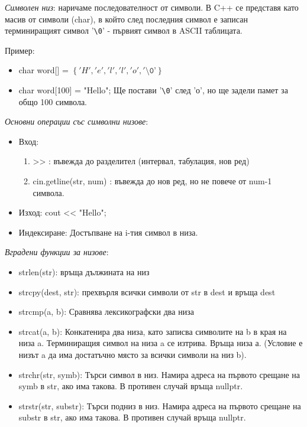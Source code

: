 \documentclass{article}
\renewcommand{\\}{\newline}
\begin{document}
\textit{Символен низ}: наричаме последователност от символи. В C++ се представя като масив от символи (char), в който след последния символ е записан терминиращият символ '\texttt{\textbackslash0}' - първият символ в ASCII таблицата.

Пример: 
\begin{itemize}
  \item char word[] = \(\left\{'H', 'e', 'l', 'l', 'o', '\texttt{\textbackslash0'} \right\}\)    
  \item char word[100] = "Hello"; Ще постави '\texttt{\textbackslash0}' след 'о', но ще задели памет за общо 100 символа.   
\end{itemize}

\textit{Основни операции със символни низове}:
\begin{itemize}
    \item Вход:
      \begin{enumerate}
          \item >> : въвежда до разделител (интервал, табулация, нов ред)
          \item cin.getline(str, num) : въвежда до нов ред, но не повече от num-1 символа.
      \end{enumerate}
    \item Изход: cout << "Hello";
    \item Индексиране: Достъпване на i-тия символ в низа.
\end{itemize}

\textit{Вградени функции за низове}:
\begin{itemize}
    \item strlen(str): връща дължината на низ
    \item strcpy(dest, str): прехвърля всички символи от str в dest и връща dest
    \item strcmp(a, b): Сравнява лексикографски два низа
    \item strcat(a, b): Конкатенира два низа, като записва символите на b в края на низа a. Терминиращия символ на низа a се изтрива. Връща низа а. (Условие е низът a да има достатъчно място за всички символи на низ b).
    \item strchr(str, symb): Търси символ в низ. Намира адреса на първото срещане на symb в str, ако има такова. В противен случай връща nullptr.
    \item strstr(str, substr): Търси подниз в низ. Намира адреса на първото срещане на substr в str, ако има такова. В противен случай връща nullptr.
\end{itemize}
\end{document}
